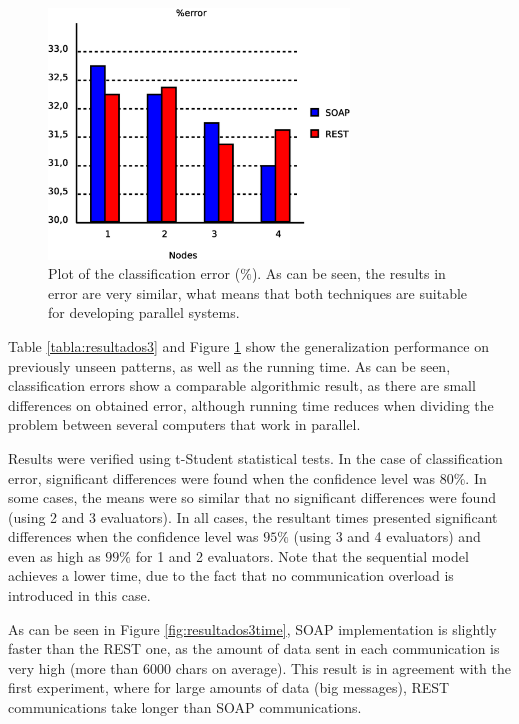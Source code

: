 \documentclass[final,1p,times]{elsarticle}
\begin{document}
\begin{figure}[!ht]
\begin{center}
\includegraphics[width=8cm]{exp3_error.eps}
\caption{Plot of the classification error ($\%$). As can be seen, the results in error are very similar, what means that both techniques are suitable for developing parallel systems.}
\label{fig:resultados3error}
\end{center}
\end{figure}


Table \ref{tabla:resultados3} and Figure \ref{fig:resultados3error} show the generalization performance on previously unseen patterns, as well as the running time.
As can be seen, classification errors show a comparable algorithmic result, as there are small differences on obtained error, although running time reduces when dividing the problem between several computers that work in parallel. 

Results were verified using t-Student statistical tests. 
In the case of classification error, significant differences were found when the confidence level was $80\%$. 
In some cases, the means were so similar that no significant differences were found (using 2 and 3 evaluators). 
In all cases, the resultant times presented significant differences when the confidence level was $95\%$ (using 3 and 4 evaluators) and even as high as $99\%$ for 1 and 2 evaluators. Note that the sequential model achieves a lower time, due to the fact that no communication overload is introduced in this case.

As can be seen in Figure \ref{fig:resultados3time}, SOAP implementation is slightly faster than the REST one, as the amount of data sent in each communication is very high (more than 6000 chars on average). This result is in agreement with the first experiment, where for large amounts of data (big messages), REST communications take longer than SOAP communications.
\end{document}
